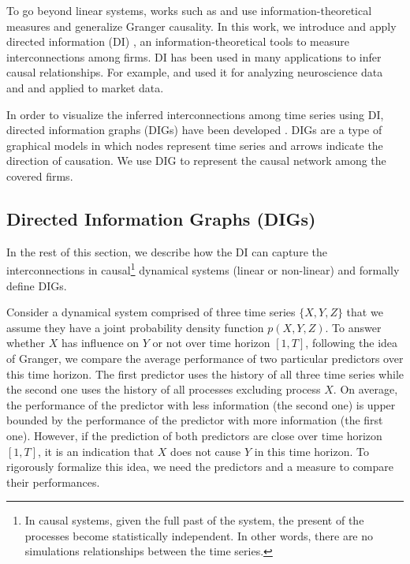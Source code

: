 To go beyond linear systems, works such as \citet{directed} and \citet{massey} use information-theoretical measures and generalize Granger causality. 
In this work, we introduce and apply directed information (DI) \citet{directed}, an information-theoretical tools to measure interconnections among firms.
DI has been used in many applications to infer causal relationships. For example, \citet{spike} and \citet{di12} used it for analyzing neuroscience data and \citet{acc2014}  and \citet{etesami2018econometric} applied to market data. 


In order to visualize the inferred interconnections among time series using DI, directed information graphs (DIGs) have been developed \citet{directed}.  
DIGs are a type of graphical models in which nodes represent time series and arrows indicate the direction of causation. We use DIG to represent the causal network among the covered firms. 



\subsection{Directed Information Graphs (DIGs)}\label{sec:dig}


In the rest of this section, we describe how the DI can capture the interconnections in causal\footnote{In causal systems, given the full past of the system, the present of the processes become statistically independent. In other words, there are no simulations relationships between the time series.} dynamical systems (linear or non-linear) and formally define DIGs.

Consider a dynamical system comprised of three time series $\{X,Y,Z\}$ that we assume they have a joint probability density function $p(X,Y,Z)$. 
To answer whether $X$ has influence on $Y$ or not over time horizon $[1,T]$,  following the idea of Granger, we compare the average performance of two particular predictors over this time horizon. 
The first predictor uses the history of all three time series while the second one uses the history of all processes excluding process $X$. 
On average, the performance of the predictor with less information (the second one) is upper bounded by the performance of the predictor with more information  (the first one). 
However,  if the prediction of both predictors are close over time horizon $[1,T]$,  it is an indication that $X$ does not cause $Y$ in this time horizon.
To rigorously formalize this idea, we need the predictors and a measure to compare their performances.

